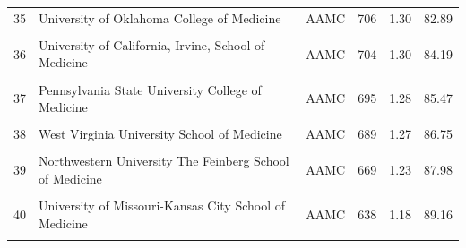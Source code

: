 \begin{tabular}{r p{} l r r r}
35 & University of Oklahoma College of Medicine & AAMC & 706 & 1.30 & 82.89 \\\\
36 & University of California, Irvine, School of Medicine & AAMC & 704 & 1.30 & 84.19 \\\\
37 & Pennsylvania State University College of Medicine & AAMC & 695 & 1.28 & 85.47 \\\\
38 & West Virginia University School of Medicine & AAMC & 689 & 1.27 & 86.75 \\\\
39 & Northwestern University The Feinberg School of Medicine & AAMC & 669 & 1.23 & 87.98 \\\\
40 & University of Missouri-Kansas City School of Medicine & AAMC & 638 & 1.18 & 89.16 \\\\
\bottomrule
\end{tabular}
